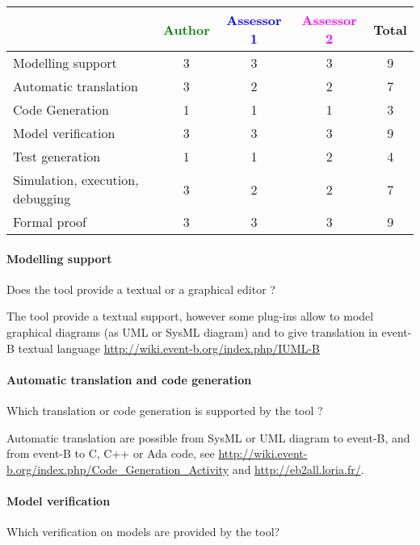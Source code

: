 \begin{tabular}{|l | c | c | c | c|}
\hline
& \textcolor{green}{Author} & \textcolor{blue}{Assessor 1} & \textcolor{magenta}{Assessor 2} & Total \\
\hline 
Modelling support & 3 & 3 & 3 & 9 \\
\hline
Automatic translation  & 3 & 2 & 2 & 7 \\
\hline
Code Generation  & 1 & 1 & 1 & 3 \\
\hline
Model verification & 3 & 3 & 3 & 9 \\
\hline
Test generation & 1 & 1 & 2 & 4 \\
\hline
Simulation, execution, debugging & 3 & 2 & 2 & 7 \\
\hline
Formal proof & 3 & 3 & 3 & 9 \\
\hline
\end{tabular}

\paragraph{Modelling support}
Does the tool provide a  textual or a graphical editor ?


\begin{author_comment}
The tool provide a textual support, however some plug-ins allow to  model graphical diagrams (as UML or SysML diagram) and to give translation in event-B textual language \url{http://wiki.event-b.org/index.php/IUML-B}
\end{author_comment}



\paragraph{Automatic translation and code generation}
Which translation or code generation is supported by the tool ?

\begin{author_comment}
Automatic translation are possible from SysML  or UML diagram to event-B, and from event-B to C, C++  or Ada code, see \url{http://wiki.event-b.org/index.php/Code_Generation_Activity} and \url{http://eb2all.loria.fr/}.
\end{author_comment}

\paragraph{Model verification}
Which verification on models are provided by the tool?

